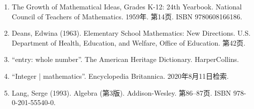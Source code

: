 \begin{enumerate}
\item The Growth of Mathematical Ideas, Grades K-12: 24th Yearbook. National Council of Teachers of Mathematics. 1959年. 第14页. ISBN 9780608166186.
\item Deans, Edwina (1963). Elementary School Mathematics: New Directions. U.S. Department of Health, Education, and Welfare, Office of Education. 第42页.
\item “entry: whole number”. The American Heritage Dictionary. HarperCollins.
\item “Integer | mathematics”. Encyclopedia Britannica. 2020年8月11日检索.
\item Lang, Serge (1993). Algebra (第3版). Addison-Wesley. 第86–87页. ISBN 978-0-201-55540-0.


\end{enumerate}
